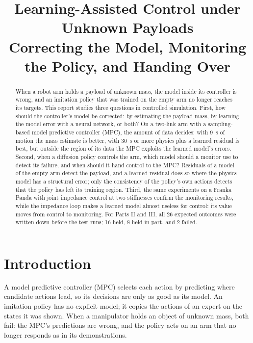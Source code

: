 \documentclass[conference]{IEEEtran}
\begin{document}
\title{Learning-Assisted Control under Unknown Payloads\\[4pt] {\Large Correcting the Model, Monitoring the Policy, and Handing Over}}

\author{
}

\maketitle

\begin{abstract}
When a robot arm holds a payload of unknown mass, the model inside its controller is wrong, and an imitation policy that was trained on the empty arm no longer reaches its targets.
This report studies three questions in controlled simulation.
First, how should the controller's model be corrected: by estimating the payload mass, by learning the model error with a neural network, or both?
On a two-link arm with a sampling-based model predictive controller (MPC), the amount of data decides: with \SI{9}{s} of motion the mass estimate is better, with \SI{30}{s} or more physics plus a learned residual is best, but outside the region of its data the MPC exploits the learned model's errors.
Second, when a diffusion policy controls the arm, which model should a monitor use to detect its failure, and when should it hand control to the MPC?
Residuals of a model of the empty arm detect the payload, and a learned residual does so where the physics model has a structural error; only the consistency of the policy's own actions detects that the policy has left its training region.
Third, the same experiments on a Franka Panda with joint impedance control at two stiffnesses confirm the monitoring results, while the impedance loop makes a learned model almost useless for control: its value moves from control to monitoring.
For Parts II and III, all 26 expected outcomes were written down before the test runs; 16 held, 8 held in part, and 2 failed.
\end{abstract}

\section{Introduction}

A model predictive controller (MPC) selects each action by predicting where candidate actions lead, so its decisions are only as good as its model.
An imitation policy has no explicit model; it copies the actions of an expert on the states it was shown.
When a manipulator holds an object of unknown mass, both fail: the MPC's predictions are wrong, and the policy acts on an arm that no longer responds as in its demonstrations.
\end{document}
